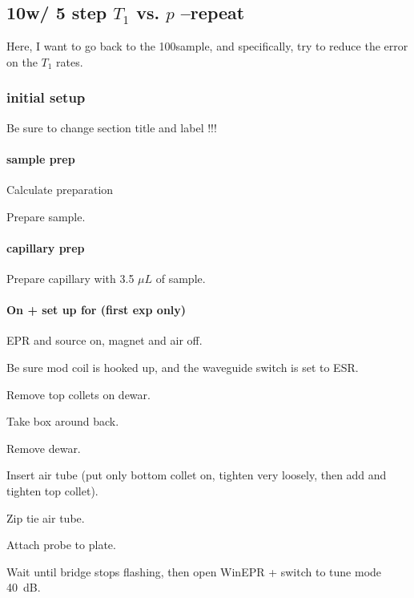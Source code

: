 \subsection{10\uM w/ 5 step $T_1$ vs. $p$ --repeat}\label{sec:4ohtseriesrepfresh_10uMt1vprep}
Here, I want to go back to the 100\mM sample, and specifically, try to reduce the error on the $T_1$ rates.

\subsubsection{initial setup}
Be sure to change section title and label !!!

\paragraph{sample prep}
Calculate preparation

Prepare sample.

\paragraph{capillary prep}
Prepare capillary with 3.5 $\mu L$ of sample.

\paragraph{On + set up for (first exp only)}
EPR and source on, magnet and air off.

Be sure mod coil is hooked up, and the waveguide switch is set to ESR.

Remove top collets on dewar.

Take box around back.

Remove dewar.

Insert air tube (put only bottom collet on, tighten very loosely, then add and tighten top collet).

Zip tie air tube.

Attach probe to plate.

Wait until bridge stops flashing, then open WinEPR + switch to tune mode 40~dB.

